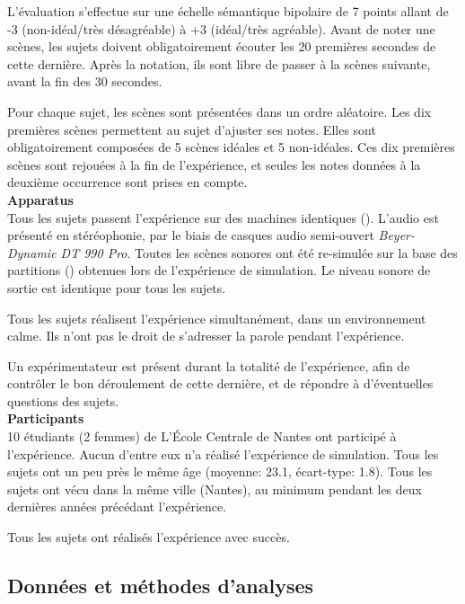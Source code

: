 L'évaluation s'effectue sur une échelle sémantique bipolaire de 7 points allant de -3 (non-idéal/très désagréable) à +3 (idéal/très agréable). Avant de noter une scènes, les sujets doivent obligatoirement écouter les 20 premières secondes de cette dernière. Après la notation, ils sont libre de passer à la scènes suivante, avant la fin des 30 secondes.

Pour chaque sujet, les scènes sont présentées dans un ordre aléatoire. Les dix premières scènes permettent au sujet d'ajuster ses notes. Elles sont obligatoirement composées de 5 scènes idéales et 5 non-idéales. Ces dix premières scènes sont rejouées à la fin de l'expérience, et seules les notes données à la deuxième occurrence sont prises en compte. \\

\textbf{Apparatus} \\

Tous les sujets passent l'expérience sur des machines identiques (). L'audio est présenté en stéréophonie, par le biais de casques audio semi-ouvert \emph{Beyer-Dynamic DT 990 Pro}. Toutes les scènes sonores ont été re-simulée sur la base des partitions () obtenues lors de l'expérience de simulation. Le niveau sonore de sortie est identique pour tous les sujets.

Tous les sujets réalisent l'expérience simultanément, dans un environnement calme. Ils n'ont pas le droit de s'adresser la parole pendant l'expérience.

Un expérimentateur est présent durant la totalité de l'expérience, afin de contrôler le bon déroulement de cette dernière, et de répondre à d'éventuelles questions des sujets.  \\

\textbf{Participants} \\

10 étudiants (2 femmes) de L’École Centrale de Nantes ont participé à l'expérience. Aucun d'entre eux n'a réalisé l'expérience de simulation. Tous les sujets ont un peu près le même âge (moyenne: 23.1, écart-type: 1.8). Tous les sujets ont vécu dans la même ville (Nantes), au minimum pendant les deux dernières années précédant l'expérience.

Tous les sujets ont réalisés l'expérience avec succès.

\subsection{Données et méthodes d'analyses}

